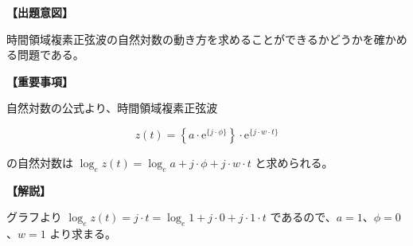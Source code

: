 \noindent \textbf{【出題意図】}

\bigskip
\noindent 時間領域複素正弦波の自然対数の動き方を求めることができるかどうかを確かめる問題である。

\vspace{1em}
\noindent \textbf{【重要事項】}

\medskip
\noindent 自然対数の公式より、時間領域複素正弦波 

\[
z(t) =  \left \{ a \cdot \textrm{e}^{\{j \cdot \phi\}} \right \} \cdot \textrm{e}^{\{j \cdot w \cdot t \}}
\]

\bigskip
\noindent の自然対数は $\log_e z(t) =  \log_e a + j \cdot \phi + j \cdot w \cdot t$ と求められる。

\bigskip

\vspace{1em}
\noindent \textbf{【解説】}

\bigskip
\noindent グラフより $\log_e z(t) =  j \cdot t = \log_e 1 + j \cdot 0 + j \cdot 1 \cdot t$ であるので、$a = 1$、$\phi = 0$、$w=1$ より求まる。
